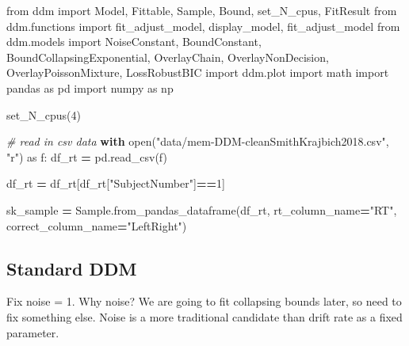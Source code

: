 \documentclass[
]{book}
\newenvironment{Shaded}{\begin{snugshade}}{\end{snugshade}}
\newcommand{\BuiltInTok}[1]{#1}
\newcommand{\CommentTok}[1]{\textcolor[rgb]{0.56,0.35,0.01}{\textit{#1}}}
\newcommand{\ControlFlowTok}[1]{\textcolor[rgb]{0.13,0.29,0.53}{\textbf{#1}}}
\newcommand{\DecValTok}[1]{\textcolor[rgb]{0.00,0.00,0.81}{#1}}
\newcommand{\ImportTok}[1]{#1}
\newcommand{\NormalTok}[1]{#1}
\newcommand{\OperatorTok}[1]{\textcolor[rgb]{0.81,0.36,0.00}{\textbf{#1}}}
\newcommand{\StringTok}[1]{\textcolor[rgb]{0.31,0.60,0.02}{#1}}
\begin{document}
\begin{Shaded}
\begin{Highlighting}[]
\ImportTok{from}\NormalTok{ ddm }\ImportTok{import}\NormalTok{ Model, Fittable, Sample, Bound, set\_N\_cpus, FitResult}
\ImportTok{from}\NormalTok{ ddm.functions }\ImportTok{import}\NormalTok{ fit\_adjust\_model, display\_model, fit\_adjust\_model}
\ImportTok{from}\NormalTok{ ddm.models }\ImportTok{import}\NormalTok{ NoiseConstant, BoundConstant, BoundCollapsingExponential, OverlayChain, OverlayNonDecision, OverlayPoissonMixture, LossRobustBIC}
\ImportTok{import}\NormalTok{ ddm.plot}
\ImportTok{import}\NormalTok{ math}
\ImportTok{import}\NormalTok{ pandas }\ImportTok{as}\NormalTok{ pd}
\ImportTok{import}\NormalTok{ numpy }\ImportTok{as}\NormalTok{ np}

\NormalTok{set\_N\_cpus(}\DecValTok{4}\NormalTok{)}

\CommentTok{\# read in csv data}
\ControlFlowTok{with} \BuiltInTok{open}\NormalTok{(}\StringTok{"data/mem{-}DDM{-}cleanSmithKrajbich2018.csv"}\NormalTok{, }\StringTok{"r"}\NormalTok{) }\ImportTok{as}\NormalTok{ f:}
\NormalTok{    df\_rt }\OperatorTok{=}\NormalTok{ pd.read\_csv(f)}

\NormalTok{df\_rt }\OperatorTok{=}\NormalTok{ df\_rt[df\_rt[}\StringTok{"SubjectNumber"}\NormalTok{]}\OperatorTok{==}\DecValTok{1}\NormalTok{]}

\NormalTok{sk\_sample }\OperatorTok{=}\NormalTok{ Sample.from\_pandas\_dataframe(df\_rt, rt\_column\_name}\OperatorTok{=}\StringTok{"RT"}\NormalTok{, correct\_column\_name}\OperatorTok{=}\StringTok{"LeftRight"}\NormalTok{)}
\end{Highlighting}
\end{Shaded}

\hypertarget{standard-ddm}{%
\subsection{Standard DDM}\label{standard-ddm}}

Fix noise = 1. Why noise? We are going to fit collapsing bounds later, so need to fix something else. Noise is a more traditional candidate than drift rate as a fixed parameter.
\end{document}
